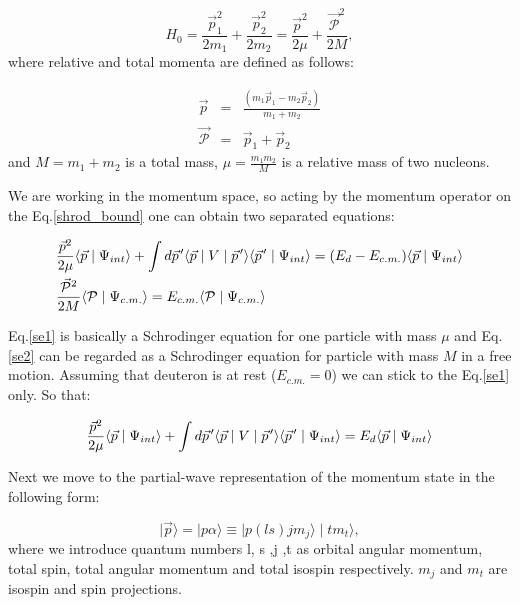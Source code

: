     \begin{equation}
        H_0 = \frac{\vec{p}_1^2}{2m_1} + \frac{\vec{p}_2^2}{2m_2} = 
        \frac{\vec{p}^2}{2\mu} + \frac{\vec{\mathcal{P}}^2}{2M}, 
    \end{equation}
    where relative and total momenta are defined as follows:

    \begin{eqnarray}
        \vec{p} &=& \frac{(m_1\vec{p}_1 - m_2\vec{p}_2)}{m_1 + m_2}\\
        \vec{\mathcal{P}} &=& \vec{p}_1 + \vec{p}_2
    \end{eqnarray}
    and $M = m_1 + m_2$ is a total mass, $\mu = \frac{m_1m_2}{M}$ is a relative mass of two nucleons.

    We are working in the momentum space, so acting by the momentum operator
    on the Eq.\ref*{shrod_bound} one can obtain two separated equations:

    \begin{eqnarray}
        &\frac{\vec{p}^2}{2\mu} \langle \vec{p} \mid \Psi_{int} \rangle +
        \int d \pvec{p} \langle \vec{p} \mid V \mid \pvec{p} \rangle
        \langle \pvec{p} \mid \Psi_{int} \rangle = 
        (E_d - E_{c.m.})\langle \vec{p} \mid \Psi_{int} \rangle \label{se1}\\
        &\frac{\vec{\mathcal{P}}^2}{2M} \langle \mathcal{P} \mid \Psi_{c.m.} \rangle = 
        E_{c.m.}\langle \mathcal{P} \mid \Psi_{c.m.} \rangle \label{se2}
    \end{eqnarray}

    Eq.\ref{se1} is basically a Schrodinger equation for one particle with mass $\mu$ 
    and Eq.\ref{se2} can be regarded as a Schrodinger equation for particle with mass $M$ in 
    a free motion. Assuming that deuteron is at rest ($E_{c.m.} = 0$) we can stick 
    to the Eq.\ref{se1} only. So that:

    \begin{equation}
        \frac{\vec{p}^2}{2\mu} \langle \vec{p} \mid \Psi_{int} \rangle +
        \int d \pvec{p} \langle \vec{p} \mid V \mid \pvec{p} \rangle
        \langle \pvec{p} \mid \Psi_{int} \rangle = 
        E_d \langle \vec{p} \mid \Psi_{int} \rangle
        \label{shrod_old}
    \end{equation}

    Next we move to the partial-wave representation of the momentum state in the following form:

    \begin{equation}
        \mid \vec{p} \rangle = \mid p \alpha \rangle \equiv \mid p (ls) j m_j \rangle \mid t m_t \rangle,
        \label{pwmain}
    \end{equation}
    where we introduce quantum numbers l, s ,j ,t as orbital angular momentum, total spin,
    total angular momentum and total isospin respectively. $m_j$ and $m_t$ are isospin
    and spin projections.


